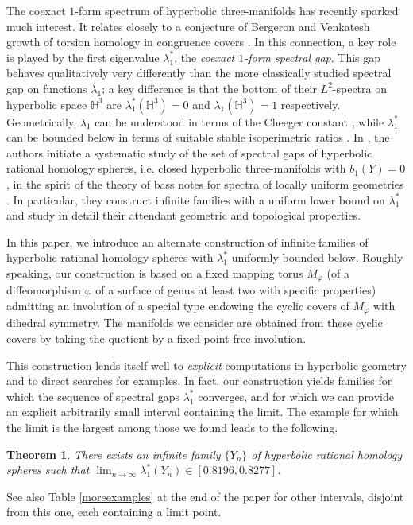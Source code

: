 \documentclass[11pt]{amsart}
\newtheorem{thm}{Theorem}
\theoremstyle{definition}
\theoremstyle{remark}
\begin{document}
The coexact $1$-form spectrum of hyperbolic three-manifolds has recently sparked much interest.  It relates closely to a conjecture of Bergeron and Venkatesh growth of torsion homology in congruence covers \cite{BV}. In this connection, a key role is played by the first eigenvalue $\lambda_1^*$, the \emph{coexact $1$-form spectral gap}. This gap behaves qualitatively very differently than the more classically studied spectral gap on functions $\lambda_1$; a key difference is that the bottom of their $L^2$-spectra on hyperbolic space $\mathbb{H}^3$ are $\lambda_1^*(\mathbb{H}^3)=0$ and $\lambda_1(\mathbb{H}^3)=1$ respectively. Geometrically, $\lambda_1$ can be understood in terms of the Cheeger constant \cite{Cha}, while $\lambda_1^*$ can be bounded below in terms of suitable stable isoperimetric ratios \cite{LS,Rud}. In \cite{AAGLZ}, the authors initiate a systematic study of the set of spectral gaps of hyperbolic rational homology spheres, i.e. closed hyperbolic three-manifolds with $b_1(Y)=0$, in the spirit of the theory of bass notes for spectra of locally uniform geometries \cite{Sar}. In particular, they construct infinite families with a uniform lower bound on $\lambda_1^*$ and study in detail their attendant geometric and topological properties.
\\
\par
In this paper, we introduce an alternate construction of infinite families of hyperbolic rational homology spheres with $\lambda_1^*$ uniformly bounded below. Roughly speaking, our construction is based on a fixed mapping torus $M_\varphi$ (of a diffeomorphism $\varphi$ of a surface of genus at least two with specific properties) admitting an involution of a special type endowing the cyclic covers of $M_\varphi$ with dihedral symmetry. The manifolds we consider are obtained from these cyclic covers by taking the quotient by a fixed-point-free involution.
\par
This construction lends itself well to \textit{explicit} computations in hyperbolic geometry and to direct searches for examples. In fact, our construction yields families for which the sequence of spectral gaps $\lambda_1^*$ converges, and for which we can provide an explicit arbitrarily small interval containing the limit. The example for which the limit is the largest among those we found leads to the following.
\begin{thm}\label{thm1}
There exists an infinite family $\{Y_n\}$ of hyperbolic rational homology spheres such that $\lim_{n\rightarrow\infty}\lambda_1^*(Y_n)\in [0.8196,0.8277]$.
\end{thm}
See also Table \ref{moreexamples} at the end of the paper for other intervals, disjoint from this one, each containing a limit point.
\end{document}
